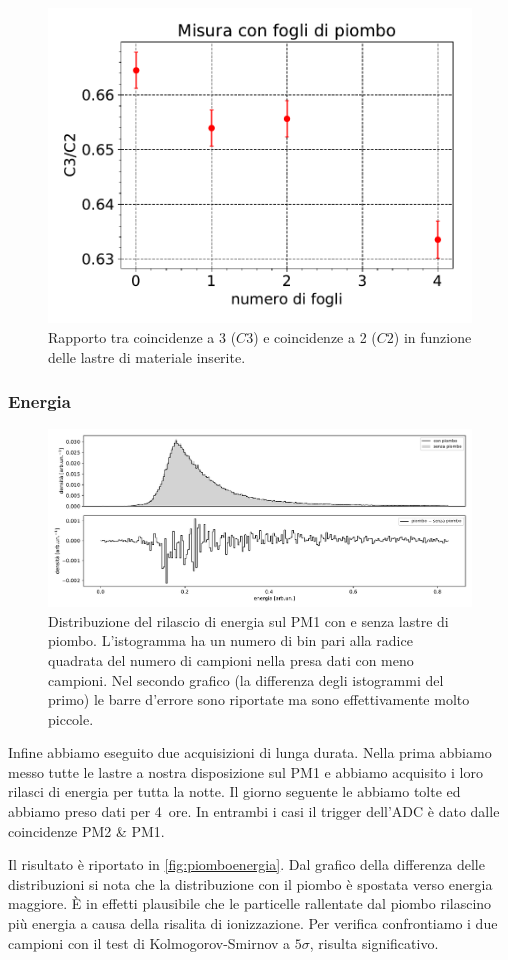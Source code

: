 \begin{figure}
\centering
\includegraphics[width=8 cm]{confronto}
\caption{Rapporto tra coincidenze a 3 ($C3$) e coincidenze a 2 ($C2$) in funzione delle lastre di materiale inserite.}
\label{cfr}
\end{figure}

\subsubsection{Energia}
\label{Jack}
\begin{figure}
	\hspace{-7.5em}
	\includegraphics[width=1.4\textwidth]{piombo_energia1}
	\caption{\label{fig:piomboenergia}
	Distribuzione del rilascio di energia sul PM1 con e senza lastre di piombo.
	L'istogramma ha un numero di bin pari alla radice quadrata del numero di campioni nella presa dati con meno campioni.
	Nel secondo grafico (la differenza degli istogrammi del primo)
	le barre d'errore sono riportate ma sono effettivamente molto piccole.}
\end{figure}

Infine abbiamo eseguito due acquisizioni di lunga durata.
Nella prima abbiamo messo tutte le lastre a nostra disposizione sul PM1
e abbiamo acquisito i loro rilasci di energia per tutta la notte.
Il giorno seguente le abbiamo tolte ed abbiamo preso dati per \SI{4}{ore}.
In entrambi i casi il trigger dell'ADC è dato dalle coincidenze PM2 \& PM1.

Il risultato è riportato in \autoref{fig:piomboenergia}.
Dal grafico della differenza delle distribuzioni
si nota che la distribuzione con il piombo è spostata verso energia maggiore.                              
È in effetti plausibile che le particelle rallentate dal piombo
rilascino più energia a causa della risalita di ionizzazione.
Per verifica confrontiamo i due campioni con il test di Kolmogorov-Smirnov a $5\sigma$,
risulta significativo.
